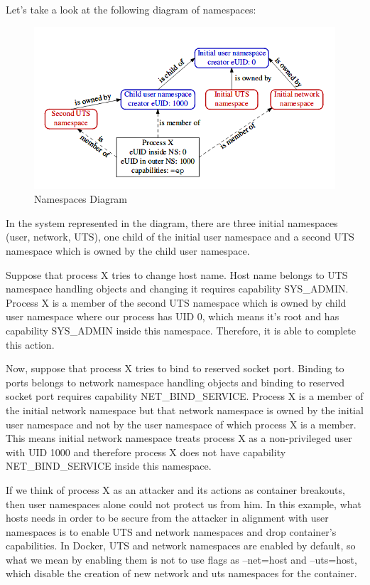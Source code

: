 Let's take a look at the following diagram of namespaces: \cite{diagramuserns}

\begin{figure}[h!]
  \centering
   \includegraphics[width=0.9\linewidth]{./figures/userns1gm.png}
   \caption{Namespaces Diagram}
\end{figure}

In the system represented in the diagram, there are three initial namespaces (user, network, UTS), one child of the initial user namespace and a second UTS namespace which is owned by the child user namespace.

Suppose that process X tries to change host name. Host name belongs to UTS namespace handling objects and changing it requires capability SYS\_ADMIN. Process X is a member of the second UTS namespace which is owned by child user namespace where our process has UID 0, which means it's root and has capability SYS\_ADMIN inside this namespace. Therefore, it is able to complete this action.

Now, suppose that process X tries to bind to reserved socket port. Binding to ports belongs to network namespace handling objects and binding to reserved socket port requires capability NET\_BIND\_SERVICE. Process X is a member of the initial network namespace but that network namespace is owned by the initial user namespace and not by the user namespace of which process X is a member. This means initial network namespace treats process X as a non-privileged user with UID 1000 and therefore process X does not have capability NET\_BIND\_SERVICE inside this namespace.

If we think of process X as an attacker and its actions as container breakouts, then user namespaces alone could not protect us from him. In this example, what hosts needs in order to be secure from the attacker in alignment with user namespaces is to enable UTS and network namespaces and drop container's capabilities. In Docker, UTS and network namespaces are enabled by default, so what we mean by enabling them is not to use flags as --net=host and --uts=host, which disable the creation of new network and uts namespaces for the container. 

